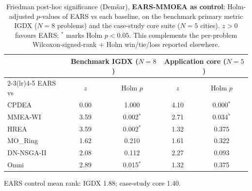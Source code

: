 \begin{table}[t]
\centering\small
\caption{Friedman post-hoc significance (Dem\v{s}ar), \textbf{EARS-MMOEA as control}: Holm-adjusted $p$-values of EARS vs each baseline, on the benchmark primary metric IGDX ($N{=}8$ problems) and the case-study core suite ($N{=}5$ cities). $z>0$ favours EARS; $^{*}$ marks Holm $p<0.05$. This complements the per-problem Wilcoxon-signed-rank + Holm win/tie/loss reported elsewhere.}
\label{tab:significance}
\begin{tabular}{lcc@{\quad}cc}
\toprule
& \multicolumn{2}{c}{Benchmark IGDX ($N{=}8$)} & \multicolumn{2}{c}{Application core ($N{=}5$)}\\
\cmidrule(lr){2-3}\cmidrule(lr){4-5}
EARS vs & $z$ & Holm $p$ & $z$ & Holm $p$ \\
\midrule
CPDEA & 0.00 & 1.000 & 4.10 & 0.000$^{*}$ \\
MMEA-WI & 3.59 & 0.002$^{*}$ & 2.71 & 0.034$^{*}$ \\
HREA & 3.59 & 0.002$^{*}$ & 1.32 & 0.375 \\
MO\_Ring & 1.62 & 0.210 & 1.61 & 0.322 \\
DN-NSGA-II & 2.08 & 0.112 & 2.27 & 0.093 \\
Omni & 2.89 & 0.015$^{*}$ & 1.32 & 0.375 \\
\bottomrule
\end{tabular}
\par\smallskip\footnotesize EARS control mean rank: IGDX 1.88; case-study core 1.40.
\end{table}
